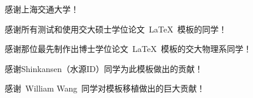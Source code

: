 
\begin{thanks}

  感谢上海交通大学！
  
  感谢所有测试和使用交大硕士学位论文~\LaTeX~模板的同学！

  感谢那位最先制作出博士学位论文~\LaTeX~模板的交大物理系同学！

  感谢Shinkansen（水源ID）同学为此模板做出的贡献！

  感谢~William Wang~同学对模板移植做出的巨大贡献！


\end{thanks}

